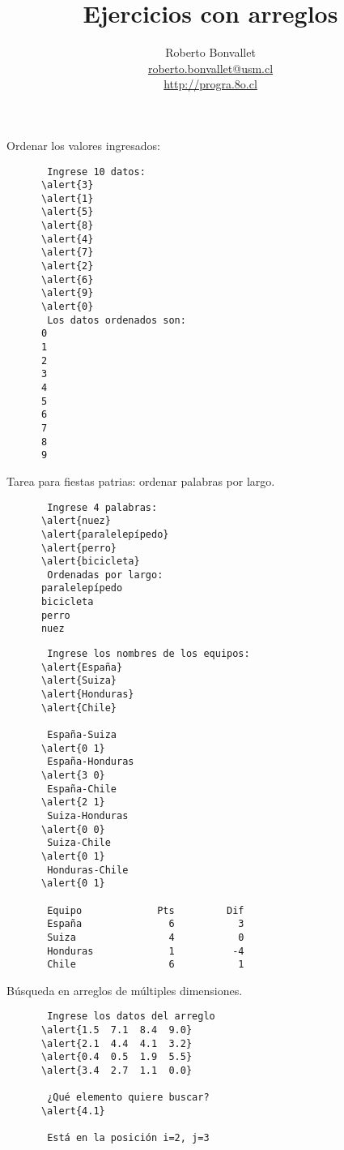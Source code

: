 \documentclass[10pt]{beamer}
\title{Ejercicios con arreglos}
\author{
  Roberto Bonvallet \\
  \url{roberto.bonvallet@usm.cl} \\
  \url{http://progra.8o.cl}
}
\begin{document}
  \begin{frame}
    \maketitle
  \end{frame}

  \begin{frame}[fragile]
    Ordenar los valores ingresados:

    \begin{Verbatim}
       Ingrese 10 datos:
      \alert{3}
      \alert{1}
      \alert{5}
      \alert{8}
      \alert{4}
      \alert{7}
      \alert{2}
      \alert{6}
      \alert{9}
      \alert{0}
       Los datos ordenados son:
      0
      1
      2
      3
      4
      5
      6
      7
      8
      9
    \end{Verbatim}

\end{frame}

  \begin{frame}[fragile]
    Tarea para fiestas patrias:
    ordenar palabras por largo.

    \begin{Verbatim}
       Ingrese 4 palabras:
      \alert{nuez}
      \alert{paralelepípedo}
      \alert{perro}
      \alert{bicicleta}
       Ordenadas por largo:
      paralelepípedo
      bicicleta
      perro
      nuez
    \end{Verbatim}

\end{frame}

  \begin{frame}[fragile]
    \begin{Verbatim}
       Ingrese los nombres de los equipos:
      \alert{España}
      \alert{Suiza}
      \alert{Honduras}
      \alert{Chile}
      
       España-Suiza
      \alert{0 1}
       España-Honduras
      \alert{3 0}
       España-Chile
      \alert{2 1}
       Suiza-Honduras
      \alert{0 0}
       Suiza-Chile
      \alert{0 1}
       Honduras-Chile
      \alert{0 1}
      
       Equipo             Pts         Dif
       España               6           3
       Suiza                4           0
       Honduras             1          -4
       Chile                6           1
    \end{Verbatim}

\end{frame}

  \begin{frame}[fragile]
    Búsqueda en arreglos de múltiples dimensiones.
    \begin{Verbatim}
       Ingrese los datos del arreglo
      \alert{1.5  7.1  8.4  9.0}
      \alert{2.1  4.4  4.1  3.2}
      \alert{0.4  0.5  1.9  5.5}
      \alert{3.4  2.7  1.1  0.0}

       ¿Qué elemento quiere buscar?
      \alert{4.1}
       
       Está en la posición i=2, j=3
    \end{Verbatim}

\end{frame}
\end{document}
